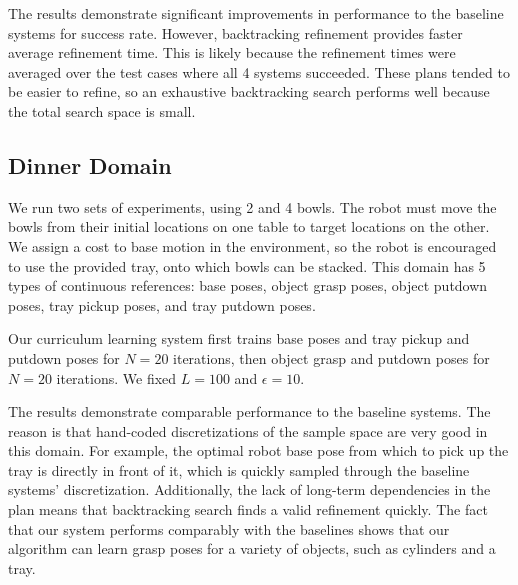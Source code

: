 The results demonstrate significant improvements in performance to the baseline systems for success rate.
However, backtracking refinement provides faster average refinement time. This is likely because the
refinement times were averaged over the test cases where all 4 systems succeeded. These plans tended
to be easier to refine, so an exhaustive backtracking search performs well because the total search space is small.

\subsection{Dinner Domain}
We run two sets of experiments, using 2 and 4 bowls. The robot must move the
bowls from their initial locations on one table to target locations on the other. We assign a cost to
base motion in the environment, so the robot is encouraged to use the provided tray, onto which bowls can be stacked.
This domain has 5 types of continuous references: base poses, object grasp poses, object putdown poses, tray pickup
poses, and tray putdown poses.

Our curriculum learning system first trains base poses and tray pickup and putdown poses for
$N = 20$ iterations, then object grasp and putdown poses for $N = 20$ iterations. We fixed $L = 100$ and $\epsilon = 10$.

The results demonstrate comparable performance to the baseline systems. The reason is that
hand-coded discretizations of the sample space are very good in this domain. For example, the optimal
robot base pose from which to pick up the tray is directly in front of it, which is quickly sampled through
the baseline systems' discretization. Additionally, the lack of long-term dependencies in the plan
means that backtracking search finds a valid refinement quickly. The fact that our system performs comparably
with the baselines shows that our algorithm can learn grasp poses for a variety of objects, such as cylinders
and a tray.